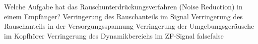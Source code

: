     {Welche Aufgabe hat das Rauschunterdrückungsverfahren (Noise Reduction) in einem Empfänger?}
    {Verringerung des Rauschanteils im Signal}
    {Verringerung des Rauschanteils in der Versorgungsspannung}
    {Verringerung der Umgebungsgeräusche im Kopfhörer}
    {Verringerung des Dynamikbereichs im ZF-Signal}
    {false}{false}